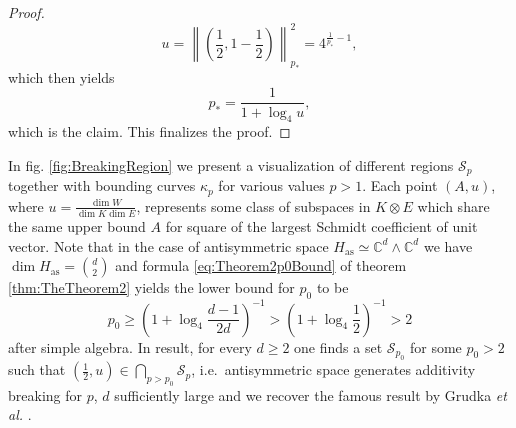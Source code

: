 \documentclass[reqno]{amsart}
\theoremstyle{plain}
\theoremstyle{note}
\newcommand{\aspace}{H_{\mathrm{as}}}
\newcommand{\complexes}{\mathbb{C}}
\begin{document}
\begin{proof}
\begin{equation}
    u = \left\| \left(\frac{1}{2}, 1-\frac{1}{2}\right) \right\|_{p_*}^{2} = 4^{\frac{1}{p_{*}}-1},
\end{equation}
which then yields
\begin{equation}
    p_* = \frac{1}{1 + \log_{4}{u}},
\end{equation}
which is the claim. This finalizes the proof.
\end{proof}

In fig. \ref{fig:BreakingRegion} we present a visualization of different regions $\mathcal{S}_p$ together with bounding curves $\kappa_p$ for various values $p > 1$. Each point $(A,u)$, where $u = \frac{\dim{W}}{\dim{K}\dim{E}}$, represents some class of subspaces in $K\otimes E$ which share the same upper bound $A$ for square of the largest Schmidt coefficient of unit vector. Note that in the case of antisymmetric space $\aspace \simeq \complexes^d \wedge \complexes^d$ we have $\dim{\aspace} = \binom{d}{2}$ and formula \eqref{eq:Theorem2p0Bound} of theorem \ref{thm:TheTheorem2} yields the lower bound for $p_0$ to be
\begin{equation}
    p_0 \geqslant \left(1 + \log_{4}\frac{d-1}{2d}\right)^{-1} > \left(1 + \log_{4}\frac{1}{2}\right)^{-1} > 2
\end{equation}
after simple algebra. In result, for every $d \geqslant 2$ one finds a set $\mathcal{S}_{p_0}$ for some $p_0 > 2$  such that $(\frac{1}{2},u) \in \bigcap_{p > p_0} \mathcal{S}_p$, i.e.~antisymmetric space generates additivity breaking for $p$, $d$ sufficiently large and we recover the famous result by Grudka \textit{et al.} \cite{Grudka_2010}.
\end{document}
